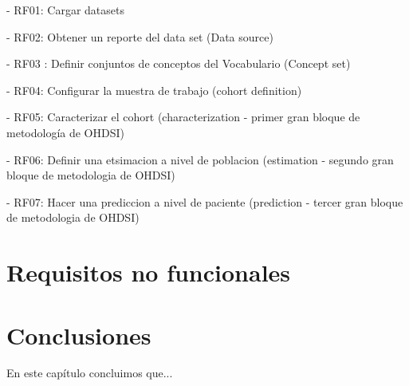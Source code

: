 - RF01: Cargar datasets

- RF02: Obtener un reporte del data set (Data source)

- RF03 : Definir conjuntos de conceptos del Vocabulario (Concept set)

- RF04: Configurar la muestra de trabajo (cohort definition)

- RF05: Caracterizar el cohort (characterization - primer gran bloque de metodología de OHDSI)

- RF06: Definir una etsimacion a nivel de poblacion (estimation - segundo gran bloque de metodologia de OHDSI)

- RF07: Hacer una prediccion a nivel de paciente (prediction - tercer gran bloque de metodologia de OHDSI)
















\section{Requisitos no funcionales}


\section{Conclusiones}

En este capítulo concluimos que...
